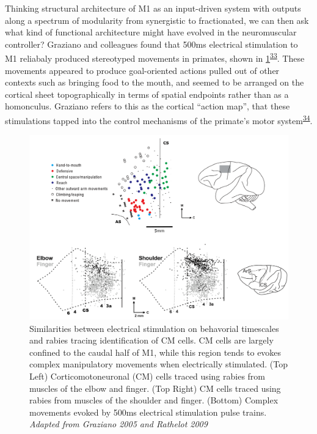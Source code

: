 \documentclass[
  a4paper,
]{article}
\begin{document}
Thinking structural architecture of M1 as an input-driven system with
outputs along a spectrum of modularity from synergistic to fractionated,
we can then ask what kind of functional architecture might have evolved
in the neuromuscular controller? Graziano and colleagues found that
500ms electrical stimulation to M1 reliabaly produced stereotyped
movements in primates, shown in
\cref{fig:rathelot_graziano}\textsuperscript{\protect\hyperlink{ref-grazianoORGANIZATIONBEHAVIORALREPERTOIRE2006}{33}}.
These movements appeared to produce goal-oriented actions pulled out of
other contexts such as bringing food to the mouth, and seemed to be
arranged on the cortical sheet topographically in terms of spatial
endpoints rather than as a homonculus. Graziano refers to this as the
cortical ``action map'', that these stimulations tapped into the control
mechanisms of the primate's motor
system\textsuperscript{\protect\hyperlink{ref-grazianoIntelligentMovementMachine2009}{34}}.

\begin{figure}
\hypertarget{fig:rathelot_graziano}{%
\centering
\includegraphics{images/physiology/rathelot_graziano.png}
\caption{Similarities between electrical stimulation on behavorial
timescales and rabies tracing identification of CM cells. CM cells are
largely confined to the caudal half of M1, while this region tends to
evokes complex manipulatory movements when electrically stimulated. (Top
Left) Corticomotoneuronal (CM) cells traced using rabies from muscles of
the elbow and finger. (Top Right) CM cells traced using rabies from
muscles of the shoulder and finger. (Bottom) Complex movements evoked by
500ms electrical stimulation pulse trains. \emph{Adapted from Graziano
2005 and Rathelot 2009}}\label{fig:rathelot_graziano}
}
\end{figure}
\end{document}
